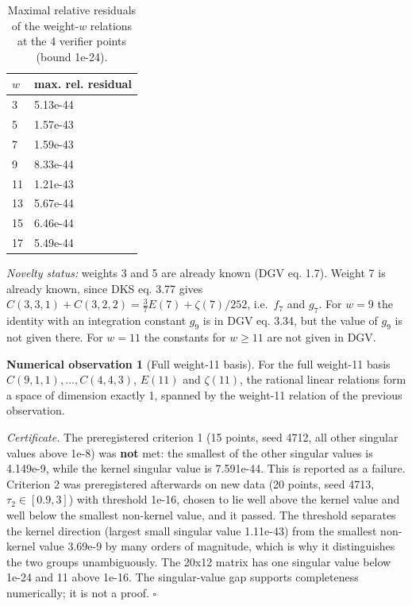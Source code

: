 \documentclass[10pt,twocolumn]{article}
\theoremstyle{definition}\newtheorem{definition}{Definition}\newtheorem{example}{Example}
\newtheorem{observation}{Numerical observation}\theoremstyle{remark}\newtheorem{remark}{Remark}
\begin{document}
\begin{table}[t]\centering\footnotesize
\caption{Maximal relative residuals of the weight-\(w\) relations at the 4 verifier points (bound 1e-24).}
\begin{tabular}{@{}ll@{}}
\toprule
\(w\) & max. rel. residual \\
\midrule
3 & 5.13e-44 \\
5 & 1.57e-43 \\
7 & 1.59e-43 \\
9 & 8.33e-44 \\
11 & 1.21e-43 \\
13 & 5.67e-44 \\
15 & 6.46e-44 \\
17 & 5.49e-44 \\
\bottomrule
\end{tabular}
\end{table}


\emph{Novelty status:} weights 3 and 5 are already known (DGV eq. 1.7). Weight 7 is already known, since DKS eq. 3.77 gives \(C(3,3,1)+C(3,2,2)=\tfrac37E(7)+\zeta(7)/252\), i.e.~\(f_7\) and \(g_7\). For \(w=9\) the identity with an integration constant \(g_9\) is in DGV eq. 3.34, but the value of \(g_9\) is not given there. For \(w=11\) the constants for \(w\ge 11\) are not given in DGV.

\begin{observation}[Full weight-11 basis]
For the full weight-11 basis \(C(9,1,1),\dots,C(4,4,3)\), \(E(11)\) and \(\zeta(11)\), the rational linear relations form a space of dimension exactly 1, spanned by the weight-11 relation of the previous observation.
\end{observation}

\emph{Certificate.} The preregistered criterion 1 (15 points, seed 4712, all other singular values above 1e-8) was \textbf{not} met: the smallest of the other singular values is 4.149e-9, while the kernel singular value is 7.591e-44. This is reported as a failure. Criterion 2 was preregistered afterwards on new data (20 points, seed 4713, \(\tau_2\in[0.9,3]\)) with threshold 1e-16, chosen to lie well above the kernel value and well below the smallest non-kernel value, and it passed. The threshold separates the kernel direction (largest small singular value 1.11e-43) from the smallest non-kernel value 3.69e-9 by many orders of magnitude, which is why it distinguishes the two groups unambiguously. The 20x12 matrix has one singular value below 1e-24 and 11 above 1e-16. The singular-value gap supports completeness numerically; it is not a proof. \(\square\)
\end{document}
